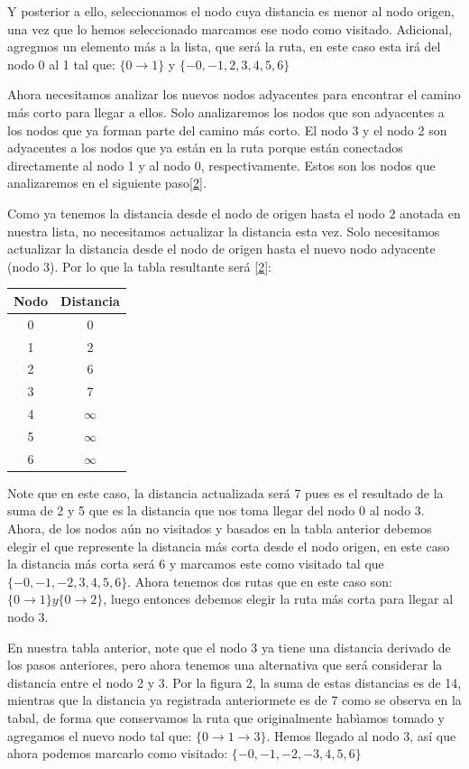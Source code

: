 \documentclass[
]{article}
\begin{document}
Y posterior a ello, seleccionamos el nodo cuya distancia es menor al
nodo origen, una vez que lo hemos seleccionado marcamos ese nodo como
visitado. Adicional, agregmos un elemento más a la lista, que será la
ruta, en este caso esta irá del nodo 0 al 1 tal que:
\(\{0 \rightarrow 1 \}\) y \(\{-0,-1,2,3,4,5,6 \}\)

Ahora necesitamos analizar los nuevos nodos adyacentes para encontrar el
camino más corto para llegar a ellos. Solo analizaremos los nodos que
son adyacentes a los nodos que ya forman parte del camino más corto. El
nodo 3 y el nodo 2 son adyacentes a los nodos que ya están en la ruta
porque están conectados directamente al nodo 1 y al nodo 0,
respectivamente. Estos son los nodos que analizaremos en el siguiente
paso{[}\protect\hyperlink{ref-noauthor_dijkstras_2020}{2}{]}.

Como ya tenemos la distancia desde el nodo de origen hasta el nodo 2
anotada en nuestra lista, no necesitamos actualizar la distancia esta
vez. Solo necesitamos actualizar la distancia desde el nodo de origen
hasta el nuevo nodo adyacente (nodo 3). Por lo que la tabla resultante
será {[}\protect\hyperlink{ref-noauthor_dijkstras_2020}{2}{]}:

\begin{longtable}[]{@{}cc@{}}
\toprule()
Nodo & Distancia \\
\midrule()
\endhead
0 & 0 \\
1 & 2 \\
2 & 6 \\
3 & 7 \\
4 & \(\infty\) \\
5 & \(\infty\) \\
6 & \(\infty\) \\
\bottomrule()
\end{longtable}

Note que en este caso, la distancia actualizada será 7 pues es el
resultado de la suma de 2 y 5 que es la distancia que nos toma llegar
del nodo 0 al nodo 3. Ahora, de los nodos aún no visitados y basados en
la tabla anterior debemos elegir el que represente la distancia más
corta desde el nodo origen, en este caso la distancia más corta será 6 y
marcamos este como visitado tal que \(\{-0,-1,-2,3,4,5,6 \}\). Ahora
tenemos dos rutas que en este caso son:
\(\{0 \rightarrow 1 \} y \{0 \rightarrow 2\}\), luego entonces debemos
elegir la ruta más corta para llegar al nodo 3.

En nuestra tabla anterior, note que el nodo 3 ya tiene una distancia
derivado de los pasos anteriores, pero ahora tenemos una alternativa que
será considerar la distancia entre el nodo 2 y 3. Por la figura 2, la
suma de estas distancias es de 14, mientras que la distancia ya
registrada anteriormete es de 7 como se observa en la tabal, de forma
que conservamos la ruta que originalmente habìamos tomado y agregamos el
nuevo nodo tal que: \(\{0 \rightarrow 1 \rightarrow 3\}\). Hemos llegado
al nodo 3, así que ahora podemos marcarlo como visitado:
\(\{-0,-1,-2,-3,4,5,6 \}\)
\end{document}

